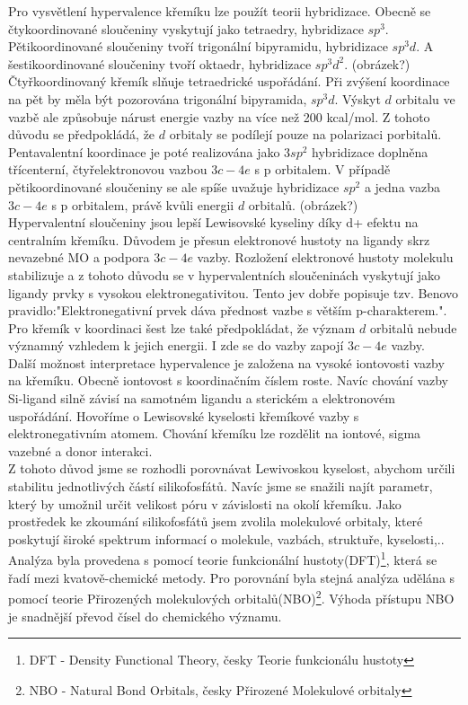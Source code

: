 \documentclass[
  digital, %
  table,   %
  lof,     %
  lot,     %
]{fithesis3}
\begin{document}
Pro vysvětlení hypervalence křemíku lze použít teorii hybridizace. Obecně se čtykoordinované sloučeniny vyskytují jako tetraedry, hybridizace $sp^3$. Pětikoordinované sloučeniny tvoří trigonální bipyramidu, hybridizace $sp^3d$. A šestikoordinované sloučeniny tvoří oktaedr, hybridizace $sp^3d^2$. (obrázek?) \\

Čtyřkoordinovaný křemík slňuje tetraedrické uspořádání. Při zvýšení koordinace na pět by měla být pozorována trigonální bipyramida, $sp^3d$. Výskyt $d$ orbitalu ve vazbě ale způsobuje nárust energie vazby na více než 200 kcal/mol. Z tohoto důvodu se předpokládá, že $d$ orbitaly se podílejí pouze na polarizaci porbitalů. Pentavalentní koordinace je poté realizována jako $3sp^2$ hybridizace doplněna třícenterní, čtyřelektronovou vazbou $3c-4e$ s p orbitalem.
 V případě pětikoordinované sloučeniny se ale spíše uvažuje hybridizace $sp^2$ a jedna vazba $3c-4e$ s p orbitalem, právě kvůli energii $d$ orbitalů. (obrázek?) \\
 Hypervalentní sloučeniny jsou lepší Lewisovské kyseliny díky d+ efektu na centralním křemíku. Důvodem je přesun elektronové hustoty na ligandy skrz nevazebné MO a podpora $3c-4e$ vazby. Rozložení elektronové hustoty molekulu stabilizuje a z tohoto důvodu se v hypervalentních sloučeninách vyskytují jako ligandy prvky s vysokou elektronegativitou. Tento jev dobře popisuje tzv. Benovo pravidlo:"Elektronegativní prvek dáva přednost vazbe s větším p-charakterem."\cite{hypervalentsiliconmacmillangroup2005}.\\
Pro křemík v koordinaci šest lze také předpokládat, že význam $d$ orbitalů nebude významný vzhledem k jejich energii. I zde se do vazby zapojí $3c-4e$ vazby\cite{Wagler2014}.\\

Další možnost interpretace hypervalence je založena na vysoké iontovosti vazby na křemíku. Obecně iontovost s koordinačním číslem roste.
Navíc chování vazby Si-ligand silně závisí na samotném ligandu a sterickém a elektronovém uspořádání. Hovoříme o Lewisovské kyselosti křemíkové vazby s elektronegativním atomem. Chování křemíku lze rozdělit na iontové, sigma vazebné a donor interakci.\cite{Wagler2014}\\

Z tohoto důvod jsme se rozhodli porovnávat Lewivoskou kyselost, abychom určili stabilitu jednotlivých částí silikofosfátů. Navíc jsme se snažili najít parametr, který by umožnil určit velikost póru v závislosti na okolí křemíku. Jako prostředek ke zkoumání silikofosfátů jsem zvolila molekulové orbitaly, které poskytují široké spektrum informací o molekule, vazbách, struktuře, kyselosti,..  Analýza byla provedena s pomocí teorie funkcionální hustoty(DFT)\footnote{DFT - Density Functional Theory, česky Teorie funkcionálu hustoty}, která se řadí mezi kvatově-chemické metody. Pro porovnání byla stejná analýza udělána s pomocí teorie Přirozených molekulových orbitalů(NBO)\footnote{NBO - Natural Bond Orbitals, česky Přirozené Molekulové orbitaly}. Výhoda přístupu NBO je snadnější převod čísel do chemického významu.
\end{document}
